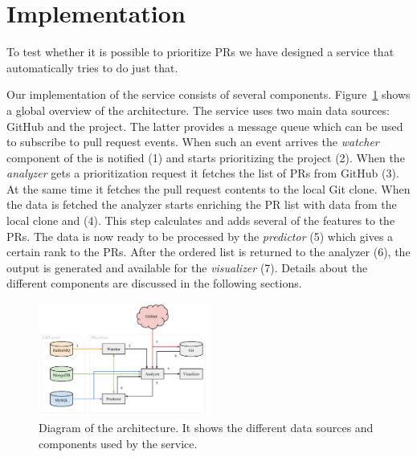 \section{Implementation}
\label{sec:implementation}

To test whether it is possible to prioritize PRs we have designed a service that automatically tries to do just that.

Our implementation of the service consists of several components.
Figure~\ref{fig:architecture} shows a global overview of the architecture.
The \prioritizer service uses two main data sources: GitHub and the \ghtorrent project.
The latter provides a message queue which can be used to subscribe to pull request events.
When such an event arrives the \emph{watcher} component of the \prioritizer is notified (1) and starts prioritizing the project (2).
When the \emph{analyzer} gets a prioritization request it fetches the list of PRs from GitHub (3).
At the same time it fetches the pull request contents to the local Git clone.
When the data is fetched the analyzer starts enriching the PR list with data from the local clone and \ghtorrent (4).
This step calculates and adds several of the features to the PRs.
The data is now ready to be processed by the \emph{predictor} (5) which gives a certain rank to the PRs.
After the ordered list is returned to the analyzer (6), the output is generated and available for the \emph{visualizer} (7).
Details about the different components are discussed in the following sections.

\begin{figure}
  \centering
  \includegraphics[width=0.5\textwidth]{../figs/architecture.pdf}
  \caption[Diagram of the architecture]
   {Diagram of the architecture. It shows the different data sources and components used by the \prioritizer service.}
  \label{fig:architecture}
\end{figure}

